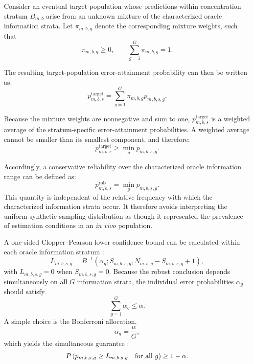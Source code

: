 Consider an eventual target population whose predictions within concentration stratum $B_{m,b}$ arise from an unknown mixture of the characterized oracle information strata. Let $\pi_{m,b,g}$ denote the corresponding mixture weights, such that
\begin{equation}
    \pi_{m,b,g} \geq 0, \qquad \sum_{g=1}^{G}\pi_{m,b,g} = 1.
\end{equation}

The resulting target-population error-attainment probability can then be written as:
\begin{equation}
    p_{m,b,s}^{\mathrm{target}} = \sum_{g=1}^{G} \pi_{m,b,g} p_{m,b,s,g}.
\end{equation}

Because the mixture weights are nonnegative and sum to one, $p^{\mathrm{target}}_{m,b,s}$ is a weighted average of the stratum-specific error-attainment probabilities. A weighted average cannot be smaller than its smallest component, and therefore:
\begin{equation}
    p_{m,b,s}^{\mathrm{target}} \geq \min_g p_{m,b,s,g}.
\end{equation}

Accordingly, a conservative reliability over the characterized oracle information range can be defined as:
\begin{equation}
    p_{m,b,s}^{\mathrm{rob}} = \min_{g} p_{m,b,s,g}.
\end{equation}
This quantity is independent of the relative frequency with which the characterized information strata occur. It therefore avoids interpreting the uniform synthetic sampling distribution as though it represented the prevalence of estimation conditions in an \textit{in vivo} population.

A one-sided Clopper--Pearson lower confidence bou\-nd can be calculated within each oracle information stratum \cite{Clopper1934}:
\begin{equation}
    L_{m,b,s,g} = B^{-1} \left( \alpha_g; S_{m,b,s,g}, N_{m,b,g} - S_{m,b,s,g} + 1 \right),
\end{equation}
with $L_{m,b,s,g}=0$ when $S_{m,b,s,g}=0$. Because the robust conclusion depends simultaneously on all $G$ information strata, the individual error probabilities $\alpha_g$ should satisfy
\begin{equation}
    \sum_{g=1}^{G} \alpha_g \leq \alpha.
\end{equation}
A simple choice is the Bonferroni allocation,
\begin{equation}
    \alpha_g = \frac{\alpha}{G},
\end{equation}
which yields the simultaneous guarantee \cite{Dunn1961}:
\begin{equation}
    P\left( p_{m,b,s,g} \geq L_{m,b,s,g} \quad \textnormal{for all}\ g \right) \geq 1-\alpha.
\end{equation}

